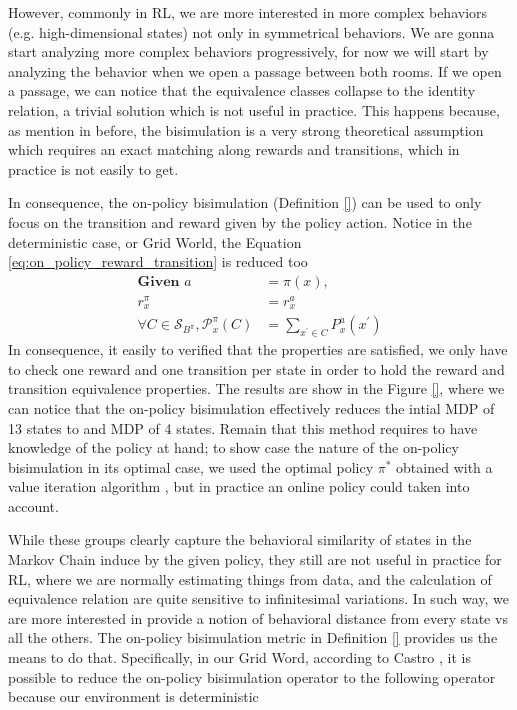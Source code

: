 However, commonly in RL, we are more interested in more complex behaviors (e.g. high-dimensional states) not only in symmetrical behaviors. We are gonna start analyzing more complex behaviors progressively, for now we will start by analyzing the behavior when we open a passage between both rooms. If we open a passage, we can notice that the equivalence classes collapse to the identity relation, a trivial solution which is not useful in practice. This happens because, as mention in before, the bisimulation is a very strong theoretical assumption which requires an exact matching along rewards and transitions, which in practice is not easily to get.

In consequence, the on-policy bisimulation (Definition \ref{}) can be used to only focus on the transition and reward given by the policy action. Notice in the deterministic case, or Grid World, the Equation \ref{eq:on_policy_reward_transition} is reduced too
\begin{equation}
\begin{aligned}
\textbf{Given } a & = \pi(x), \\
r_x^\pi & = r_x^a \\
\forall C \in \mathcal{S}_{B^\pi}, \mathcal{P}_x^\pi(C) & = \sum_{x^{\prime} \in C} P_x^a( x^{\prime})
\end{aligned}
\end{equation}
In consequence, it easily to verified that the properties are satisfied, we only have to check one reward and one transition per state in order to hold the reward and transition equivalence properties. The results are show in the Figure \ref{}, where we can notice that the on-policy bisimulation effectively reduces the intial MDP of 13 states to and MDP of 4 states. Remain that this method requires to have knowledge of the policy at hand; to show case the nature of the on-policy bisimulation in its optimal case, we used the optimal policy $\pi^*$ obtained with a value iteration algorithm \cite{sutton2018reinforcement}, but in practice an online policy could taken into account. 

While these groups clearly capture the behavioral similarity of states in the Markov Chain induce by the given policy, they still are not useful in practice for RL, where we are normally estimating things from data, and the calculation of equivalence relation are quite sensitive to infinitesimal variations. In such way, we are more interested in provide a notion of behavioral distance from every state vs all the others. The on-policy bisimulation metric in Definition \ref{} provides us the means to do that. Specifically, in our Grid Word, according to Castro \cite{castro2020scalable}, it is possible to reduce the on-policy bisimulation operator to the following operator because our environment is deterministic

